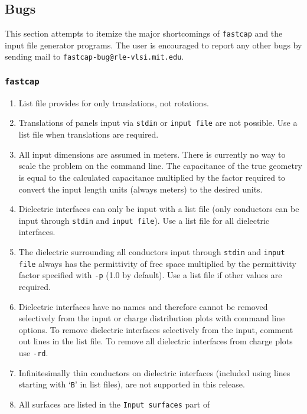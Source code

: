%
%
\subsection{Bugs}

This section attempts to itemize the major shortcomings of {\tt fastcap}
and the input file generator programs. 
The user is encouraged to report any other bugs by sending mail
to \verb~fastcap-bug@rle-vlsi.mit.edu~.

\subsubsection*{{\tt fastcap}}

\begin{enumerate}
\item List file provides for only translations, not rotations.
\item Translations of panels input via {\tt stdin} or {\tt input file}
are not possible.  Use a list file when translations are required.
\item All input dimensions are assumed in meters. There is currently
no way to scale the problem on the command line. The capacitance
of the true geometry is equal to the calculated capacitance multiplied
by the factor required to convert the input length units (always meters)
to the desired units.
\item Dielectric interfaces can only be input with a list file
(only conductors can be input through {\tt stdin} and {\tt input file}).
Use a list file for all dielectric interfaces.
\item The  dielectric surrounding all conductors
input through {\tt stdin} and {\tt input file} always has the 
permittivity of free space
multiplied by the permittivity factor specified with {\tt -p} (1.0 by
default).
Use a list file if other values are required.
\item Dielectric interfaces have no names and therefore cannot be
removed selectively from the input or charge distribution plots
with command line options.
To remove dielectric interfaces selectively from the input, comment out
lines in the list file.  To remove all dielectric interfaces from
charge plots use {\tt -rd}.
\item Infinitesimally thin conductors on dielectric interfaces (included
using lines starting with `{\tt B}' in list files), are not supported
in this release.
\item All surfaces are listed in the {\tt Input surfaces} part of

\end{enumerate}
